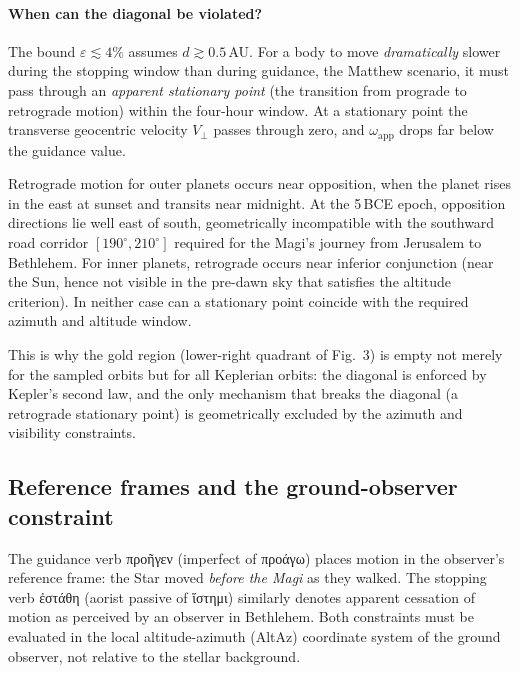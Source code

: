 \documentclass[11pt,a4paper]{article}
\newcommand{\grk}[1]{{\fontencoding{LGR}\selectfont #1}}
\newcommand{\grk}[1]{{\greekfont #1}}
\begin{document}
\paragraph{When can the diagonal be violated?}
The bound $\varepsilon \lesssim 4\%$ assumes $d \gtrsim 0.5$\,AU.
For a body to move \emph{dramatically} slower during the stopping window
than during guidance, the Matthew scenario, it must pass through an
\emph{apparent stationary point} (the transition from prograde to retrograde
motion) within the four-hour window. At a stationary point the transverse
geocentric velocity $V_\perp$ passes through zero, and $\omega_\mathrm{app}$
drops far below the guidance value.

Retrograde motion for outer planets occurs near opposition, when the planet
rises in the east at sunset and transits near midnight. At the 5\,BCE epoch,
opposition directions lie well east of south, geometrically incompatible with
the southward road corridor $[190^\circ,210^\circ]$ required for the Magi's
journey from Jerusalem to Bethlehem. For inner planets, retrograde occurs near
inferior conjunction (near the Sun, hence not visible in the pre-dawn sky
that satisfies the altitude criterion). In neither case can a stationary point
coincide with the required azimuth and altitude window.

This is why the gold region (lower-right quadrant of Fig.~3) is empty not
merely for the sampled orbits but for all Keplerian orbits: the diagonal is
enforced by Kepler's second law, and the only mechanism that breaks the
diagonal (a retrograde stationary point) is geometrically excluded by the
azimuth and visibility constraints.

\subsection{Reference frames and the ground-observer constraint}
\label{subsec:refframes}

The guidance verb \grk{προῆγεν} (imperfect of \grk{προάγω}) places motion in the
observer's reference frame: the Star moved \emph{before the Magi} as they walked.
The stopping verb \grk{ἐστάθη} (aorist passive of \grk{ἵστημι}) similarly denotes
apparent cessation of motion as perceived by an observer in Bethlehem. Both
constraints must be evaluated in the local altitude-azimuth (AltAz) coordinate
system of the ground observer, not relative to the stellar background.
\end{document}
